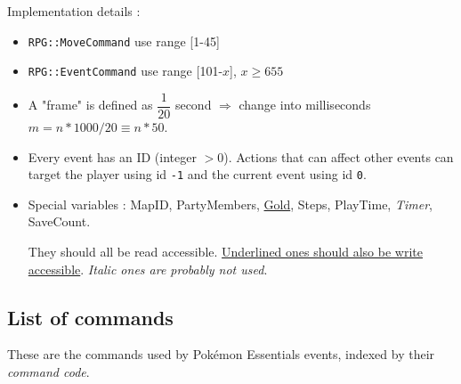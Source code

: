 \documentclass[11pt]{article}
\begin{document}
{Implementation details :
\begin{itemize}
	\item \verb|RPG::MoveCommand| use range [1-45]
	
	\item \verb|RPG::EventCommand| use range [101-$x$], $x\geq 655$
	
	\item A "frame" is defined as $\dfrac{1}{20}$ second $\Rightarrow$ change into milliseconds $m=n*1000/20\equiv n*50$.
	
	\item Every event has an ID (integer $>0$). Actions that can affect other events can target the player using id \verb|-1| and the current event using id \verb|0|.
	
	\item Special variables : MapID, PartyMembers, \underline{Gold}, Steps, PlayTime, \textit{Timer}, SaveCount.
	
	They should all be read accessible. \underline{Underlined ones should also be write accessible}. \textit{Italic ones are probably not used}.
\end{itemize}

\newpage
\subsection*{List of commands}

These are the commands used by Pokémon Essentials events, indexed by their \textit{command code}. 

}
\end{document}
